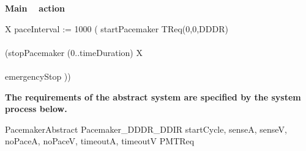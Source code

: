 \textbf{ Main \Circus~ action }\\

\begin{circusaction}
	\circspot \circmu X \circspot paceInterval := 1000 \circseq ( startPacemaker \then TReq(0,0,DDDR) \\ 
   \circinterrupt \\
  (stopPacemaker \then \circwait(0..timeDuration) \circseq X \\ 
  \extchoice \\
  emergencyStop \then \Stop))
\end{circusaction}


\begin{circus}
  \circend
\end{circus}


\textbf{The requirements of the abstract system are specified by the system process below. }\\

\begin{circus}
\circprocess PacemakerAbstract \circdef  Pacemaker\_DDDR\_DDIR \lpar \lchanset startCycle, senseA, senseV, noPaceA, noPaceV, timeoutA, timeoutV \rchanset \rpar PMTReq
\end{circus}
